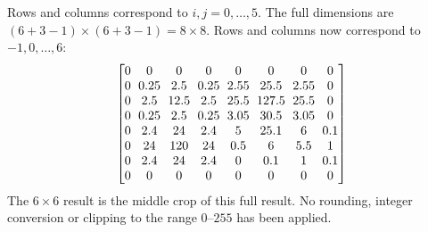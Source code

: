 {Rows and columns correspond to $i,j=0,\ldots,5$.
The full dimensions are $(6+3-1)\times(6+3-1)=8\times8$.
Rows and columns now correspond to $-1,0,\ldots,6$:
\[\setlength{\arraycolsep}{3pt}\begin{bmatrix}
0&0&0&0&0&0&0&0\\
0&0.25&2.5&0.25&2.55&25.5&2.55&0\\
0&2.5&12.5&2.5&25.5&127.5&25.5&0\\
0&0.25&2.5&0.25&3.05&30.5&3.05&0\\
0&2.4&24&2.4&5&25.1&6&0.1\\
0&24&120&24&0.5&6&5.5&1\\
0&2.4&24&2.4&0&0.1&1&0.1\\
0&0&0&0&0&0&0&0
\end{bmatrix}\]
The $6\times6$ result is the middle crop of this full result. No rounding,
integer conversion or clipping to the range $0$--$255$ has been applied.
}

